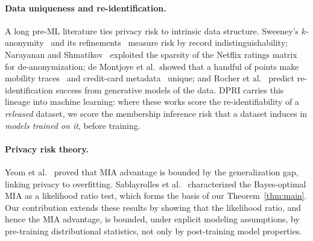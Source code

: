 \paragraph{Data uniqueness and re-identification.}
A long pre-ML literature ties privacy risk to intrinsic data structure.
Sweeney's $k$-anonymity~\cite{sweeney2002k} and its
refinements~\cite{machanavajjhala2007diversity,li2007tcloseness} measure
risk by record indistinguishability; Narayanan and
Shmatikov~\cite{narayanan2008robust} exploited the sparsity of the
Netflix ratings matrix for de-anonymization; de Montjoye et al.\ showed
that a handful of points make mobility traces~\cite{demontjoye2013unique}
and credit-card metadata~\cite{demontjoye2015unique} unique; and Rocher
et al.~\cite{rocher2019estimating} predict re-identification success
from generative models of the data. DPRI carries this lineage into
machine learning: where these works score the re-identifiability of a
\emph{released} dataset, we score the membership inference risk that a
dataset induces in \emph{models trained on it}, before training.

\paragraph{Privacy risk theory.}
Yeom et al.~\cite{yeom2018privacy} proved that MIA advantage is bounded
by the generalization gap, linking privacy to overfitting.
Sablayrolles et al.~\cite{sablayrolles2019whitebox} characterized the
Bayes-optimal MIA as a likelihood ratio test, which forms the basis of
our Theorem~\ref{thm:main}.
Our contribution extends these results by showing that the likelihood
ratio, and hence the MIA advantage, is bounded, under explicit modeling
assumptions, by pre-training distributional statistics, not only by
post-training model properties.

